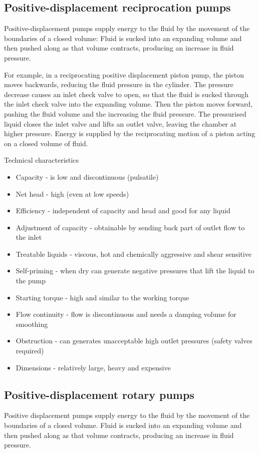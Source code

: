 \subsection{Positive-displacement reciprocation pumps}
Positive-displacement pumps supply energy to the fluid by the movement of the boundaries of a closed volume: Fluid is sucked into an expanding volume and then pushed along as that volume contracts, producing an increase in fluid pressure.

For example, in a reciprocating positive displacement piston pump, the piston moves backwards, reducing the fluid pressure in the cylinder. The pressure decrease causes an inlet check valve to open, so that the fluid is sucked through the inlet check valve into the expanding volume. Then the piston moves forward, pushing the fluid volume and the increasing the fluid pressure. The pressurised liquid closes the inlet valve and lifts an outlet valve, leaving the chamber at higher pressure. Energy is supplied by the reciprocating motion of a piston acting on a closed volume of fluid.

Technical characteristics
\begin{itemize}
  \item Capacity - is low and discontinuous (pulsatile)
  \item Net head - high (even at low speeds)
  \item Efficiency - independent of capacity and head and good for any liquid
  \item Adjustment of capacity - obtainable by sending back part of outlet flow to the inlet
  \item Treatable liquids - viscous, hot and chemically aggressive and shear sensitive
  \item Self-priming - when dry can generate negative pressures that lift the liquid to the pump
  \item Starting torque - high and similar to the working torque
  \item Flow continuity - flow is discontinuous and needs a damping volume for smoothing
  \item Obstruction - can generates unacceptable high outlet pressures (safety valves required)
  \item Dimensions - relatively large, heavy and expensive
\end{itemize}
\subsection{Positive-displacement rotary pumps}
Positive displacement pumps supply energy to the fluid by the movement of the boundaries of a closed volume. Fluid is sucked into an expanding volume and then pushed along as that volume contracts, producing an increase in fluid pressure.


